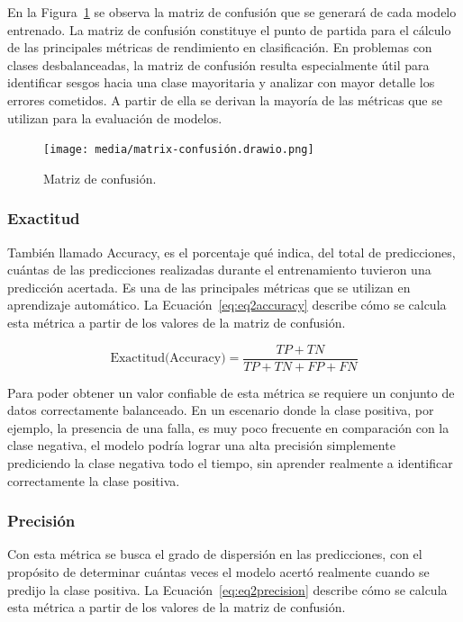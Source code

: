 \documentclass[11pt,a4paper,spanish]{book}
\numberwithin{equation}{chapter}
\numberwithin{figure}{chapter}
\begin{document}
En la Figura~\ref{fig:figMatrixConfusion} se observa la matriz de confusión que se generará 
de cada modelo entrenado. 
La matriz de confusión constituye el punto de partida para el cálculo de las principales 
métricas de rendimiento en clasificación. En problemas con clases desbalanceadas, la 
matriz de confusión resulta especialmente útil para identificar sesgos hacia una clase 
mayoritaria y analizar con mayor detalle los errores cometidos. A partir de ella se 
derivan la mayoría de las métricas que se utilizan para la evaluación de modelos. 


\begin{figure}[H]
    \caption{Matriz de confusión.}
    \centering
    \texttt{[image: media/matrix-confusión.drawio.png]}
    \label{fig:figMatrixConfusion}
\end{figure}


\subsubsection{Exactitud}

También llamado Accuracy, es el porcentaje qué indica, del total de predicciones, 
cuántas de las predicciones realizadas durante el entrenamiento tuvieron una predicción 
acertada. Es una de las principales métricas que se utilizan en aprendizaje automático. 
La Ecuación~\eqref{eq:eq2accuracy} describe cómo se calcula esta métrica a partir de 
los valores de la matriz de confusión. 

\begin{equation}\label{eq:eq2accuracy}
\text{Exactitud(Accuracy)} = \frac{TP + TN}{TP + TN + FP + FN}
\end{equation}

Para poder obtener un valor confiable de esta métrica se requiere un conjunto de datos 
correctamente balanceado.  En un escenario donde la clase positiva, por ejemplo, la 
presencia de una falla, es muy poco frecuente en comparación con la clase negativa, el 
modelo podría lograr una alta precisión simplemente prediciendo la clase negativa todo 
el tiempo, sin aprender realmente a identificar correctamente la clase positiva.

\subsubsection{Precisión}

Con esta métrica se busca el grado de dispersión en las predicciones, con el propósito 
de determinar cuántas veces el modelo acertó realmente cuando se predijo la clase 
positiva. La Ecuación~\eqref{eq:eq2precision} describe cómo se calcula esta métrica a 
partir de los valores de la matriz de confusión. 
\end{document}
